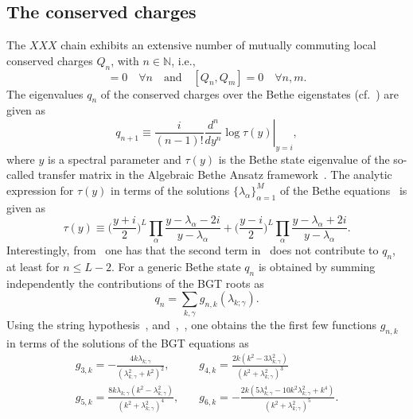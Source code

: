 \documentclass[11pt]{iopart}
\begin{document}
\subsection{The conserved charges}
\label{sec:1.5}

The $XXX$ chain exhibits an extensive number of mutually commuting local conserved 
charges $Q_n$, with $n\in\mathbb{N}$, i.e., 
%
\begin{equation}
[Q_n,{\mathcal H}]=0\quad\forall n\quad\textrm{and}\quad [Q_n,Q_m]=0\quad\forall n,m.
\end{equation}
%
The eigenvalues $q_n$ of the conserved charges over the Bethe eigenstates 
(cf.~) are given as 
%
\begin{equation}
\label{Q-def}
\left.q_{n+1}\equiv\frac{i}{(n-1)!}\frac{d^n}{dy^n}\log\tau
(y)\right|_{y=i},
\end{equation}
%
where $y$ is a spectral parameter and $\tau(y)$ is the Bethe state eigenvalue of the 
so-called transfer matrix in the Algebraic Bethe Ansatz framework~\cite{kor-book}. 
The analytic expression for $\tau(y)$ in terms of the solutions 
$\{\lambda_\alpha\}_{\alpha=1}^M$ of the Bethe equations~ is given as 
%
\begin{equation}
\label{tau}
\tau(y)\equiv\Big(\frac{y+i}{2}\Big)^L\prod\limits_\alpha\frac{y-\lambda_\alpha-2i}
{y-\lambda_\alpha}+\Big(\frac{y-i}{2}\Big)^L\prod\limits_\alpha\frac{y-\lambda_\alpha
+2i}{y-\lambda_\alpha}.
\end{equation}
%
Interestingly, from~ one has that the second term in~ does not 
contribute to $q_n$, at least for $n\le L-2$. 
For a generic Bethe state $q_n$ is obtained by summing independently the contributions 
of the BGT roots as 
%
\begin{equation}
\label{qngnk}
q_n=\sum_{k,\gamma}g_{n,k}(\lambda_{k;\gamma}).
\end{equation}
%
Using the string hypothesis~, and~,~, one obtains  
the the first few functions $g_{n,k}$ in terms of the solutions of the BGT equations as 
%
\begin{eqnarray}
\label{gnk}
g_{3,k}=-\frac{4k\lambda_{k;\gamma}}{(\lambda_{k;\gamma}^2+k^2)^2}, &\quad  
g_{4,k}=\frac{2k(k^2-3\lambda_{k;\gamma}^2)}{(k^2+\lambda_{k;\gamma}^2)^3}\\\nonumber 
g_{5,k}=\frac{8k\lambda_{k;\gamma}(k^2-\lambda_{k;\gamma}^2)}{(k^2+
\lambda_{k;\gamma}^2)^4}, & \quad
g_{6,k}=-\frac{2k(5\lambda_{k;\gamma}^4-10k^2\lambda_{k;\gamma}^2+k^4)}{(k^2+
\lambda_{k;\gamma}^2)^5}. 
\end{eqnarray}
\end{document}
